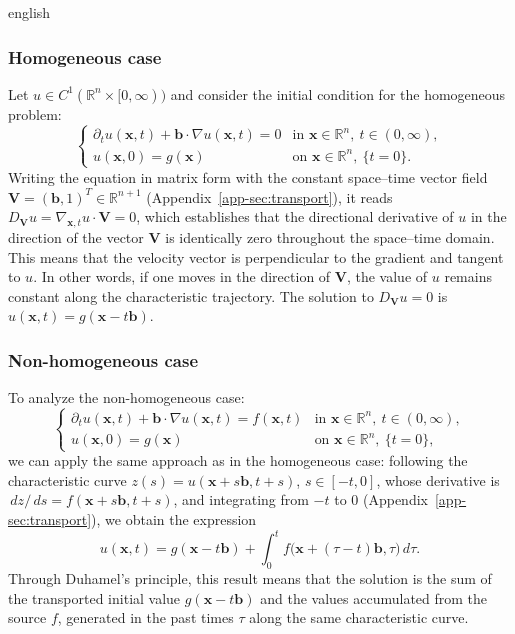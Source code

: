 \documentclass[11pt,letterpaper,twoside,openright]{book} %
\begin{document}
\begin{hyphenrules}{english}
\subsubsection{Homogeneous case}
Let $u\in C^1(\mathbb{R}^n\times[0,\infty))$ and consider the initial condition for the homogeneous problem:
\begin{equation}
  \begin{cases}
    \partial_t u(\mathbf{x},t)+\mathbf{b}\cdot\nabla u(\mathbf{x},t)=0 & \text{in } \mathbf{x}\in\mathbb{R}^n,\ t\in(0,\infty),\\
    u(\mathbf{x},0)=g(\mathbf{x}) & \text{on } \mathbf{x}\in\mathbb{R}^n,\ \{t=0\}.
  \end{cases}
  \label{eq:transport-hom}
\end{equation}
Writing the equation in matrix form with the constant space--time vector field
$\mathbf{V}=(\mathbf{b},1)^{T}\in\mathbb{R}^{n+1}$ (Appendix~\ref{app-sec:transport}), it reads
$D_{\mathbf{V}}u=\nabla_{\mathbf{x},t}u\cdot\mathbf{V}=0$, which establishes that the directional derivative of $u$ in the direction of the vector $\mathbf{V}$ is
identically zero throughout the space--time domain. This means that the velocity vector is perpendicular
to the gradient and tangent to $u$. In other words, if one moves in the direction of
$\mathbf{V}$, the value of $u$ remains constant along the characteristic trajectory. The solution to
$D_{\mathbf{V}}u=0$ is $u(\mathbf{x},t)=g(\mathbf{x}-t\mathbf{b})$.

\subsubsection{Non-homogeneous case}
To analyze the non-homogeneous case:
\begin{equation}
  \begin{cases}
    \partial_t u(\mathbf{x},t)+\mathbf{b}\cdot\nabla u(\mathbf{x},t)=f(\mathbf{x},t) & \text{in } \mathbf{x}\in\mathbb{R}^n,\ t\in(0,\infty),\\
    u(\mathbf{x},0)=g(\mathbf{x}) & \text{on } \mathbf{x}\in\mathbb{R}^n,\ \{t=0\},
  \end{cases}
  \label{eq:transport-nonhom}
\end{equation}
we can apply the same approach as in the homogeneous case: following the characteristic curve
$z(s)=u(\mathbf{x}+s\mathbf{b},t+s)$, $s\in[-t,0]$, whose derivative is $\,d z/\,d s=f(\mathbf{x}+s\mathbf{b},t+s)$,
and integrating from $-t$ to $0$ (Appendix~\ref{app-sec:transport}), we obtain the expression
\begin{equation}
  u(\mathbf{x},t)=g(\mathbf{x}-t\mathbf{b})+\int_{0}^{t}f\big(\mathbf{x}+(\tau-t)\mathbf{b},\tau\big)\,d\tau.
  \label{eq:transport-duhamel}
\end{equation}
Through Duhamel's principle, this result means that the solution is the sum of the transported initial
value $g(\mathbf{x}-t\mathbf{b})$ and the values accumulated from the source $f$, generated in the past times $\tau$
along the same characteristic curve.


\end{hyphenrules}
\end{document}
